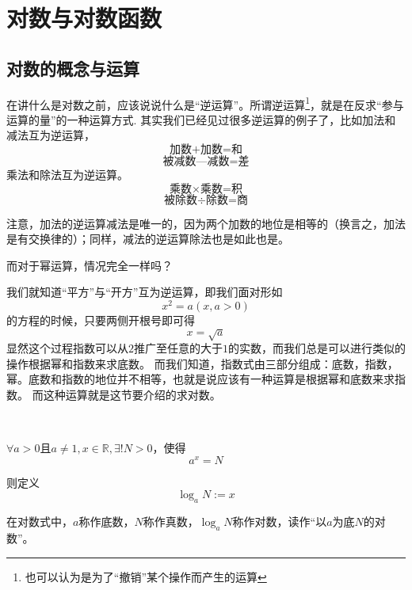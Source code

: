 \clearpage
\section{对数与对数函数}
\subsection{对数的概念与运算}
在讲什么是对数之前，应该说说什么是“逆运算”。所谓逆运算\footnote{也可以认为是为了“撤销”某个操作而产生的运算}，就是在反求“参与运算的量”的一种运算方式.
其实我们已经见过很多逆运算的例子了，比如加法和减法互为逆运算，
\[\text{加数+加数=和}\]
\[\text{被减数—减数=差}\]
乘法和除法互为逆运算。
\[\text{乘数}\times \text{乘数=积}\]
\[\text{被除数}\div\text{除数=商} \]

注意，加法的逆运算减法是唯一的，因为两个加数的地位是相等的（换言之，加法是有交换律的）；同样，减法的逆运算除法也是如此也是。

而对于幂运算，情况完全一样吗？

我们就知道“平方”与“开方”互为逆运算，即我们面对形如
\[x^2=a(x,a>0)\]的方程的时候，只要两侧开根号即可得\[x=\sqrt{a}\]
显然这个过程指数可以从$2$推广至任意的大于$1$的实数，而我们总是可以进行类似的操作根据幂和指数来求底数。
而我们知道，指数式由三部分组成：底数，指数，幂。底数和指数的地位并不相等，也就是说应该有一种运算是根据幂和底数来求指数。
而这种运算就是这节要介绍的求对数。
\begin{definition}[对数]
    \ 

    $\forall a>0\text{且}a\ne1,x\in \mathbb{R},\exists!N>0$，使得
    \[a^x=N\]

    则定义
    \[\log_aN:=x\]

    在对数式中，$a$称作底数，$N$称作真数，$\log_aN$称作对数，读作“以$a$为底$N$的对数”。
\end{definition}

